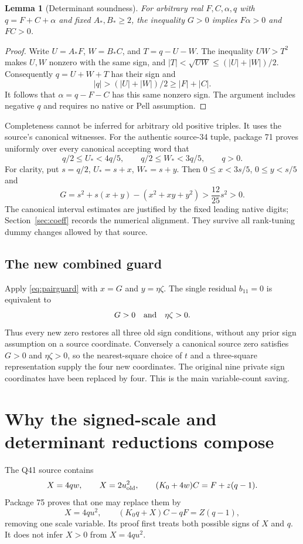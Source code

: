\documentclass[11pt]{article}
\newtheorem{lemma}[theorem]{Lemma}
\begin{document}
\begin{lemma}[Determinant soundness]\label{lem:det}
For arbitrary real $F,C,\alpha,q$ with $q=F+C+\alpha$ and fixed
$A_*,B_*\ge2$, the inequality $G>0$ implies
$F\alpha>0$ and $FC>0$.
\end{lemma}
\begin{proof}
Write $U=A_*F$, $W=B_*C$, and $T=q-U-W$.
The inequality $UW>T^2$ makes $U,W$ nonzero with the same sign, and
$|T|<\sqrt{UW}\le(|U|+|W|)/2$.
Consequently $q=U+W+T$ has their sign and
\[
 |q|>(|U|+|W|)/2\ge |F|+|C|.
\]
It follows that $\alpha=q-F-C$ has this same nonzero sign.
The argument includes negative $q$ and requires no native or Pell assumption.
\end{proof}
Completeness cannot be inferred for arbitrary old positive triples. It uses
the source's canonical witnesses. For the authentic source-34 tuple, package
71 proves uniformly over every canonical accepting word that
\begin{equation}\label{eq:canonicalbox}
 q/2\le U_*<4q/5,\qquad q/2\le W_*<3q/5,\qquad q>0.
\end{equation}
For clarity, put $s=q/2$, $U_*=s+x$, $W_*=s+y$.
Then $0\le x<3s/5$, $0\le y<s/5$ and
\[
 G=s^2+s(x+y)-(x^2+xy+y^2)>\frac{12}{25}s^2>0.
\]
The canonical interval estimates are justified by the fixed leading
native digits; Section~\ref{sec:coeff} records the numerical alignment.
They survive all rank-tuning dummy changes allowed by that source.

\subsection{The new combined guard}
Apply \eqref{eq:pairguard} with $x=G$ and $y=\eta\zeta$.
The single residual $b_{11}=0$ is equivalent to
\[
 G>0\quad\hbox{and}\quad\eta\zeta>0.
\]
Thus every new zero restores all three old sign conditions, without any
prior sign assumption on a source coordinate. Conversely a canonical
source zero satisfies $G>0$ and $\eta\zeta>0$, so the nearest-square
choice of $t$ and a three-square representation supply the four new
coordinates. The original nine private sign coordinates have been replaced
by four. This is the main variable-count saving.

\section{Why the signed-scale and determinant reductions compose}
\label{sec:compatibility}
The Q41 source contains
\[
 X=4q w,\qquad X=2u_{\rm old}^2,\qquad
 (K_0+4w)C=F+z(q-1).
\]
Package 75 proves that one may replace them by
\begin{equation}\label{eq:bootstrap}
 X=4qu^2,\qquad (K_0q+X)C-qF=Z(q-1),
\end{equation}
removing one scale variable. Its proof first treats both possible signs of
$X$ and $q$. It does not infer $X>0$ from $X=4qu^2$.
\end{document}
